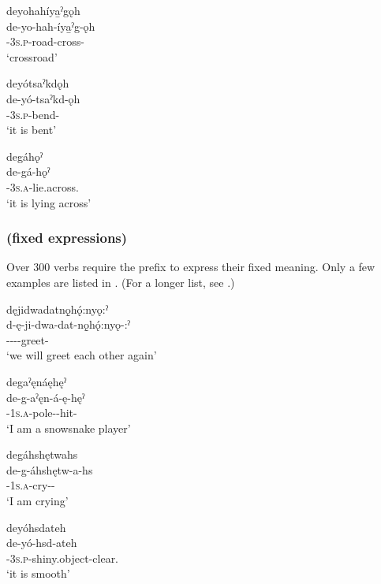 \ea\label{ex:detwoex3}

\ea deyohahíya̱ˀgǫh\\
\gll de-yo-hah-íya̱ˀg-ǫh\\
{\dualic}-\textsc{3s.p}-road-cross-{\stative}\\
\glt `crossroad'

\ex deyótsaˀkdǫh\\
\gll de-yó-tsaˀkd-ǫh\\
{\dualic}-\textsc{3s.p}-bend-{\stative}\\
\glt `it is bent'

\ex degáhǫˀ\\
\gll de-gá-hǫˀ\\
{\dualic}-\textsc{3s.a}-lie.across.{\stative}\\
\glt `it is lying across'
\z
\z

\subsubsection*{ (fixed expressions)} \label{[de-verb] (fixed expressions)}
Over 300 verbs require the  {\dualic} prefix to express their fixed meaning. Only a few examples are listed in . (For a longer list, see .)

\ea\label{ex:detwoex4}

\ea dęjidwadatnǫ̱hǫ́:nyǫ:ˀ\\
\gll d-ę-ji-dwa-dat-nǫ̱hǫ́:nyǫ-:ˀ\\
{\dualic}-{\future}--{}-greet-{\punctual}\\
\glt `we will greet each other again'

\ex degaˀęnáęhęˀ\\
\gll de-g-aˀęn-á-ę-hęˀ\\
{\dualic}-\textsc{1s.a}-pole-{\joinerA}-hit-{\habitual}\\
\glt `I am a snowsnake player'

\ex degáhshętwahs\\
\gll de-g-áhshętw-a-hs\\
{\dualic}-\textsc{1s.a}-cry-{\joinerA}-{\habitual}\\
\glt `I am crying'

\ex deyóhsdateh\\
\gll de-yó-hsd-ateh\\
{\dualic}-\textsc{3s.p}-shiny.object-clear.{\stative}\\
\glt `it is smooth'

